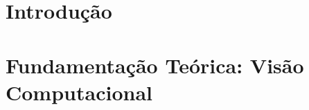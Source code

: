 \documentclass[rascunho]{fei}
\begin{document}
\chapter{Introdução}
\label{chap:introduction}




\chapter{Fundamentação Teórica: Visão Computacional}
\label{chap:revision}




%

\end{document}

